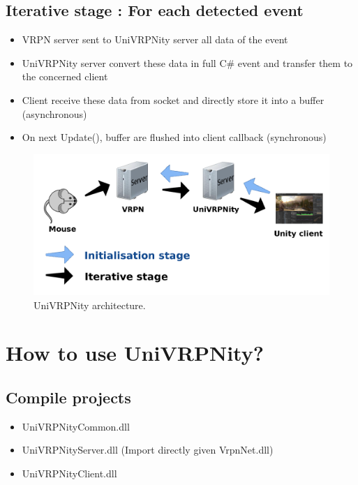\documentclass[11pt]{article} %
\begin{document}
\subsection{Iterative stage : For each detected event}
\begin{itemize}
      \item VRPN server sent to UniVRPNity server all data of the event 
	\item UniVRPNity server convert these data in full C\# event and transfer them to the concerned client
	\item Client receive these data from socket and directly store it into a buffer (asynchronous)
	\item On next Update(), buffer are flushed into client callback (synchronous)
\end{itemize}



\begin{figure}[H]
	\includegraphics[scale=0.3]{UniVRPNityOrder.png} 
	\caption{UniVRPNity architecture.}
\end{figure}


\section{How to use UniVRPNity?}

\subsection{Compile projects}
	\begin{itemize}
		\item UniVRPNityCommon.dll
		\item UniVRPNityServer.dll (Import directly given VrpnNet.dll)
		\item UniVRPNityClient.dll
	\end{itemize}
\end{document}
